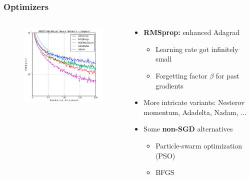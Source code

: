 \documentclass[aspectratio=169]{beamer}
\newcommand\imageright[1]{ %
    \caption*{\scalebox{.5}{\textcolor{lightgray}{\textcopyright~#1}}} %
}
\begin{document}
\begin{frame}
\frametitle{Optimizers}

\begin{columns}
    \begin{column}{0.48\textwidth}
        \begin{figure}
            \includegraphics[width=\linewidth]{optimizers.png}
            \imageright{Machine Learning Mastery}
        \end{figure}
    \end{column}
    \begin{column}{0.48\textwidth}
        \begin{itemize}
            \item \textbf{RMSprop:} enhanced Adagrad
            \begin{itemize}
                \item Learning rate got infinitely small
                \item Forgetting factor $\beta$ for past gradients
            \end{itemize}
            \item More intricate variants: Nesterov momentum, Adadelta, Nadam, $\dots$
            \item Some \textbf{non-SGD} alternatives
            \begin{itemize}
                \item Particle-swarm optimization (PSO)
                \item BFGS
            \end{itemize}
        \end{itemize}
    \end{column}
\end{columns}
\end{frame}
\end{document}
